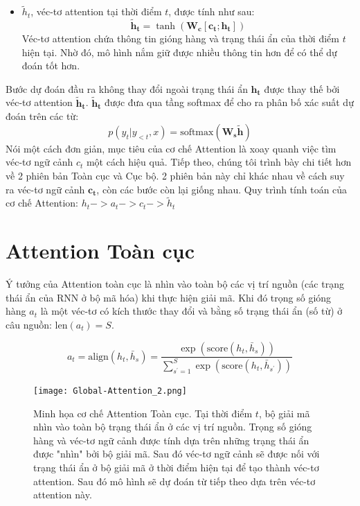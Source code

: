 \begin{itemize}
	\item $\tilde{h}_t$, véc-tơ attention tại thời điểm $t$, được tính như sau:
	\begin{equation}
	\boldsymbol{\tilde{h}_t} = \tanh(\bm{W_c}[\bm{c_t};\bm{h_t}])
	\end{equation}
	Véc-tơ attention chứa thông tin gióng hàng và trạng thái ẩn của thời điểm $t$ hiện tại. Nhờ đó, mô hình nắm giữ được nhiều thông tin hơn để có thể dự đoán tốt hơn.
\end{itemize}
Bước dự đoán đầu ra không thay đổi ngoài trạng thái ẩn $\bm{h_t}$ được thay thế bởi véc-tơ attention $\bm{\tilde{h}_t}$. $\bm{\tilde{h}_t}$ được đưa qua tầng softmax để cho ra phân bố xác suất dự đoán trên các từ:
\begin{equation}
p(y_t | y_{<t}, x) = \text{softmax}(\bm{W_s\tilde{h}})
\end{equation}
Nói một cách đơn giản, mục tiêu của cơ chế Attention là xoay quanh việc tìm véc-tơ ngữ cảnh $c_t$ một cách hiệu quả.
Tiếp theo, chúng tôi trình bày chi tiết hơn về 2 phiên bản Toàn cục và Cục bộ. 2 phiên bản này chỉ khác nhau về cách suy ra véc-tơ ngữ cảnh $\bm{c_t}$, còn các bước còn lại giống nhau.
Quy trình tính toán của cơ chế Attention: $h_t -> a_t -> c_t -> \tilde{h}_t$
\section{Attention Toàn cục}
Ý tưởng của Attention toàn cục là nhìn vào toàn bộ các vị trí nguồn (các trạng thái ẩn của RNN ở bộ mã hóa) khi thực hiện giải mã.
Khi đó trọng số gióng hàng $a_t$ là một véc-tơ có kích thước thay đổi và bằng số trạng thái ẩn (số từ) ở câu nguồn: $\text{len}(a_t) = S$.

\begin{equation}
a_t = \text{align}(h_t, \bar{h}_s) = \frac{\exp\left(\text{score}(h_t, \bar{h}_s)\right)}{\sum^{S}_{s^{'}=1}\exp\left(\text{score}(h_t, \bar{h}_{s^{'}})\right)}
\end{equation}

\begin{figure}
	\centering
	\texttt{[image: Global-Attention\_2.png]}
	\caption[Minh họa cơ chế Attention Toàn cục.]{Minh họa cơ chế Attention Toàn cục. Tại thời điểm $t$, bộ giải mã nhìn vào toàn bộ trạng thái ẩn ở các vị trí nguồn. Trọng số gióng hàng và véc-tơ ngữ cảnh được tính dựa trên những trạng thái ẩn được "nhìn" bởi bộ giải mã. Sau đó véc-tơ ngữ cảnh sẽ được nối với trạng thái ẩn ở bộ giải mã ở thời điểm hiện tại để tạo thành véc-tơ attention. Sau đó mô hình sẽ dự đoán từ tiếp theo dựa trên véc-tơ attention này.}
	\label{fig_Global_Attention}
\end{figure}

